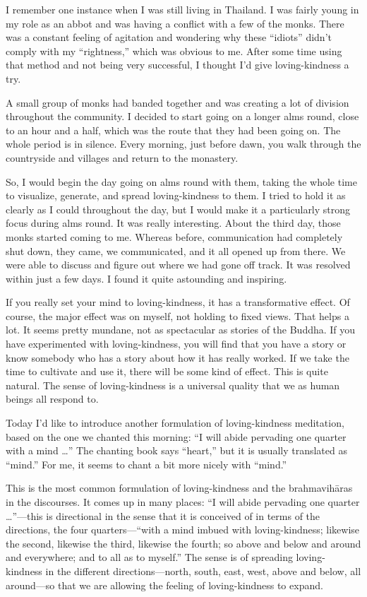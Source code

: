 I remember one instance when I was still living in Thailand. I was
fairly young in my role as an abbot and was having a conflict with a few
of the monks. There was a constant feeling of agitation and wondering
why these “idiots” didn’t comply with my “rightness,” which was obvious
to me. After some time using that method and not being very successful,
I thought I’d give loving-kindness a try.

A small group of monks had banded together and was creating a lot of
division throughout the community. I decided to start going on a longer
alms round, close to an hour and a half, which was the route that they
had been going on. The whole period is in silence. Every morning, just
before dawn, you walk through the countryside and villages and return to
the monastery.

So, I would begin the day going on alms round with them, taking the
whole time to visualize, generate, and spread loving-kindness to them. I
tried to hold it as clearly as I could throughout the day, but I would
make it a particularly strong focus during alms round. It was really
interesting. About the third day, those monks started coming to me.
Whereas before, communication had completely shut down, they came, we
communicated, and it all opened up from there. We were able to discuss
and figure out where we had gone off track. It was resolved within just
a few days. I found it quite astounding and inspiring.

If you really set your mind to loving-kindness, it has a transformative
effect. Of course, the major effect was on myself, not holding to fixed
views. That helps a lot. It seems pretty mundane, not as spectacular as
stories of the Buddha. If you have experimented with loving-kindness,
you will find that you have a story or know somebody who has a story
about how it has really worked. If we take the time to cultivate and use
it, there will be some kind of effect. This is quite natural. The sense
of loving-kindness is a universal quality that we as human beings all
respond to.

Today I’d like to introduce another formulation of loving-kindness
meditation, based on the one we chanted this morning: “I will abide
pervading one quarter with a mind \ldots{}” The chanting book says “heart,”
but it is usually translated as “mind.” For me, it seems to chant a bit
more nicely with “mind.”

This is the most common formulation of loving-kindness and the
brahmavihāras in the discourses. It comes up in many places: “I will
abide pervading one quarter \ldots{}”—this is directional in the sense that
it is conceived of in terms of the directions, the four quarters—“with a
mind imbued with loving-kindness; likewise the second, likewise the
third, likewise the fourth; so above and below and around and
everywhere; and to all as to myself.” The sense is of spreading
loving-kindness in the different directions—north, south, east, west,
above and below, all around—so that we are allowing the feeling of
loving-kindness to expand.

